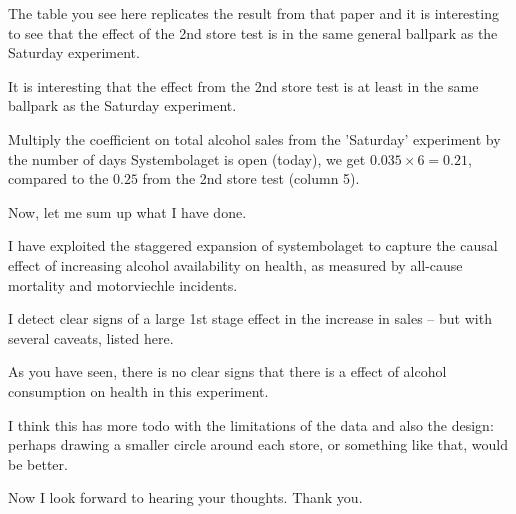 \documentclass[12pt]{article}
\begin{document}
The table you see here replicates the result from that paper and it is interesting to see that the effect of the 2nd store test is in the same general ballpark as the Saturday experiment.

It is interesting that the effect from the 2nd store test is at least in the same ballpark as the Saturday experiment. 

Multiply the coefficient on total alcohol sales from the 'Saturday' experiment by the number of days Systembolaget is open (today), we get $0.035 \times 6 = 0.21$, compared to the $0.25$ from the 2nd store test (column 5). 

Now, let me sum up what I have done.

I have exploited the staggered expansion of systembolaget to capture the causal effect of increasing alcohol availability on health, as measured by all-cause mortality and motorviechle incidents. 

I detect clear signs of a large 1st stage effect in the increase in sales -- but with several caveats, listed here.

As you have seen, there is no clear signs that there is a effect of alcohol consumption on health in this experiment. 

I think this has more todo with the limitations of the data and also the design: perhaps drawing a smaller circle around each store, or something like that, would be better.

Now I look forward to hearing your thoughts. Thank you.
 
\end{document}
